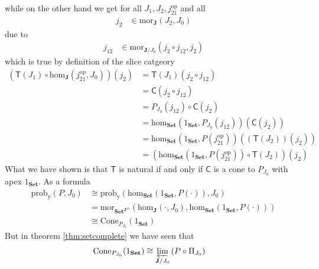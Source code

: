 while on the other hand we get for all $J_{1},J_{2},j_{21}^{\textrm{op}}$ and all
\begin{align*}
  j_{2}
  &\in
  \mathrm{mor}_{\mathbf{J}}(J_{2},J_{0})
\end{align*}
due to
\begin{align*}
  j_{12}
  &\in
  \mathrm{mor}_{\mathbf{J} \slash J_{0}}
  \left(
    j_{2}
    \circ
    j_{12},
    j_{2}
  \right)
\end{align*}
which is true by definition of the slice catgeory
\begin{align*}
  \left(
    \mathsf{T}(J_{1})
    \circ
    \mathrm{hom}_{\mathbf{J}}
    \left(
      j_{21}^{\textrm{op}},
      J_{0}
    \right)
  \right)
  (j_{2})
  &=
  \mathsf{T}(J_{1})
  \left(
    j_{2}
    \circ
    j_{12}
  \right)
  \\
  &=
  \mathsf{C}
  \left(
    j_{2}
    \circ
    j_{12}
  \right)
  \\
  &=
  P_{J_{0}}(j_{12})
  \circ
  \mathsf{C}(j_{2})
  \\
  &=
  \mathrm{hom}_{\mathbf{Set}}
  \left(
    1_{\mathbf{Set}},
    P_{J_{0}}(j_{12})
  \right)
  (\mathsf{C}(j_{2}))
  \\
  &=
  \mathrm{hom}_{\mathbf{Set}}
  \left(
    1_{\mathbf{Set}},
    P(j_{21}^{\textrm{op}})
  \right)
  \left(
    (\mathsf{T}(J_{2}))(j_{2})
  \right)
  \\
  &=
  \left(
    \mathrm{hom}_{\mathbf{Set}}
    \left(
      1_{\mathbf{Set}},
      P(j_{21}^{\textrm{op}})
    \right)
    \circ
    \mathsf{T}(J_{2})
  \right)
  (j_{2})
\end{align*}
What we have shown is that $\mathsf{T}$ is natural if and only if $\mathsf{C}$ is a cone to $P_{J_{0}}$ with apex $1_{\mathbf{Set}}$. As a formula
\begin{align*}
  \mathrm{prob}_{\mathrm{y}}
  \left(
    P,
    J_{0}
  \right)
  &\cong
  \mathrm{prob}_{\mathrm{y}}
  \left(
    \mathrm{hom}_{\mathbf{Set}}(1_{\mathbf{Set}},P(\cdot)),
    J_{0}
  \right)
  \\
  &=
  \mathrm{mor}_{\mathbf{Set}^{\mathbf{J}^{\textrm{op}}}}
  \left(
    \mathrm{hom}_{\mathbf{J}}(\cdot,J_{0}),
    \mathrm{hom}_{\mathbf{Set}}(1_{\mathbf{Set}},P(\cdot))
  \right)
  \\
  &\cong
  \mathrm{Cone}_{P_{J_{0}}}(1_{\mathbf{Set}})
\end{align*}
But in theorem \ref{thm:setcomplete} we have seen that
\begin{align*}
  \mathrm{Cone}_{P_{J_{0}}}(1_{\mathbf{Set}})
  &\cong
  \varprojlim_{\mathbf{J} \slash J_{0}}
  \left(
    P
    \circ
    \Pi_{J_{0}}
  \right)
\end{align*}
